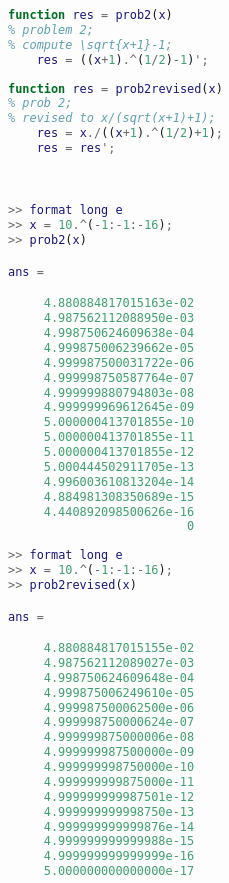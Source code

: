 \begin{lstlisting}[language = MATLAB]
function res = prob2(x)
% problem 2;
% compute \sqrt{x+1}-1;
    res = ((x+1).^(1/2)-1)';
\end{lstlisting}
\begin{lstlisting}[language = MATLAB]
function res = prob2revised(x)
% prob 2;
% revised to x/(sqrt(x+1)+1);
    res = x./((x+1).^(1/2)+1);
    res = res';
\end{lstlisting}
\\
\begin{minipage}{0.5\textwidth}
\begin{lstlisting}[language = MATLAB]
>> format long e
>> x = 10.^(-1:-1:-16);
>> prob2(x)

ans =

     4.880884817015163e-02
     4.987562112088950e-03
     4.998750624609638e-04
     4.999875006239662e-05
     4.999987500031722e-06
     4.999998750587764e-07
     4.999999880794803e-08
     4.999999969612645e-09
     5.000000413701855e-10
     5.000000413701855e-11
     5.000000413701855e-12
     5.000444502911705e-13
     4.996003610813204e-14
     4.884981308350689e-15
     4.440892098500626e-16
                         0
\end{lstlisting}
\end{minipage}
\hspace{10pt}
\begin{minipage}{0.5\textwidth}
\begin{lstlisting}[language = MATLAB]
>> format long e
>> x = 10.^(-1:-1:-16);
>> prob2revised(x)

ans =

     4.880884817015155e-02
     4.987562112089027e-03
     4.998750624609648e-04
     4.999875006249610e-05
     4.999987500062500e-06
     4.999998750000624e-07
     4.999999875000006e-08
     4.999999987500000e-09
     4.999999998750000e-10
     4.999999999875000e-11
     4.999999999987501e-12
     4.999999999998750e-13
     4.999999999999876e-14
     4.999999999999988e-15
     4.999999999999999e-16
     5.000000000000000e-17
\end{lstlisting}
\end{minipage}
\\

